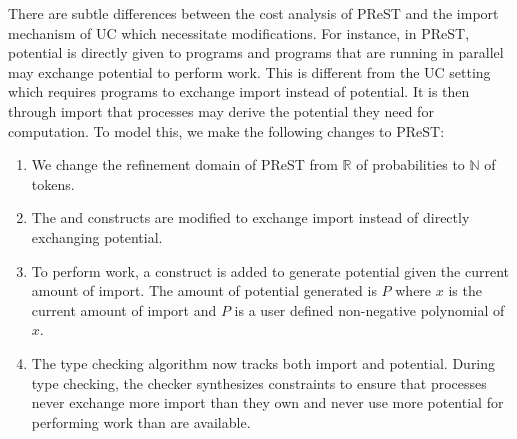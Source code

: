 There are subtle differences between the cost analysis of PReST and the import
mechanism of UC which necessitate modifications. For instance, in PReST, potential is
directly given to programs and programs that are running in parallel may
exchange potential to perform work. This is different from the UC setting which
requires programs to exchange import instead of potential. It is then through
import that processes may derive the potential they need for computation. 
To model this, we make the following changes to PReST:
\begin{enumerate}
\item We change the refinement domain of PReST from $\mathbb{R}$ of probabilities to $\mathbb{N}$ of tokens.
\item The  and  constructs are modified to exchange import instead of directly exchanging potential.
\item To perform work, a  construct is added to generate potential given the current amount 
of import. The amount of potential generated is $P$ where $x$ is the current amount of import and $P$ is a user 
defined non-negative polynomial of $x$.
\item The type checking algorithm now tracks both import and potential. During type checking, the checker synthesizes constraints to ensure that processes never exchange more import than they own and never use more potential
for performing work than are available.


\end{enumerate}